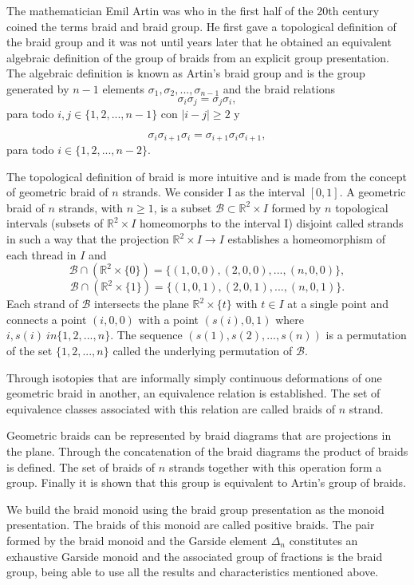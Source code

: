 \documentclass[12pt]{book}
\theoremstyle{definition}
\begin{document}
The mathematician Emil Artin was who in the first half of the 20th century coined the terms braid and braid group. He first gave a topological definition of the braid group and it was not until years later that he obtained an equivalent algebraic definition of the group of braids from an explicit group presentation. The algebraic definition is known as Artin's braid group and is the group generated by $n-1$ elements $\sigma_1, \sigma_2, ..., \sigma_{n-1}$ and the braid relations
$$\sigma_i\sigma_j = \sigma_j\sigma_i,$$
para todo $i,j\in\{1,2,...,n-1\}$ con $|i-j|\geq 2$ y

$$\sigma_i\sigma_{i+1}\sigma_i =\sigma_{i+1}\sigma_i\sigma_{i+1},$$
para todo $i\in\{1,2,...,n-2\}$.

The topological definition of braid is more intuitive and is made from the concept of geometric braid of $n$ strands. We consider I as the interval $[0,1]$. A geometric braid of $n$ strands, with $n\geq 1$, is a subset $\mathcal{B}\subset\mathbb{R}^2\times I$ formed by $n$ topological intervals (subsets of $\mathbb{R}^2\times I$ homeomorphs to the interval I) disjoint called strands in such a way that the projection $\mathbb{R}^2\times I\rightarrow I$ establishes a homeomorphism of each thread in $I$ and
$$\mathcal{B}\cap(\mathbb{R}^2\times \{0\})=\{(1,0,0),(2,0,0),...,(n,0,0)\},$$
$$\mathcal{B}\cap(\mathbb{R}^2\times \{1\})=\{(1,0,1),(2,0,1),...,(n,0,1)\}.$$
Each strand of $\mathcal {B}$ intersects the plane $\mathbb{R}^2 \times \{t \}$ with $t\in I$ at a single point and connects a point $(i, 0 , 0)$ with a point $(s(i), 0,1)$ where $i, s (i) \ in\{1,2, ..., n \} $. The sequence $(s(1), s(2), ..., s(n))$ is a permutation of the set $\{1,2, ..., n\}$ called the underlying permutation of $\mathcal{B}$.

Through isotopies that are informally simply continuous deformations of one geometric braid in another, an equivalence relation is established. The set of equivalence classes associated with this relation are called braids of $n$ strand.

Geometric braids can be represented by braid diagrams that are projections in the plane. Through the concatenation of the braid diagrams the product of braids is defined. The set of braids of $n$ strands together with this operation form a group. Finally it is shown that this group is equivalent to Artin's group of braids.

We build the braid monoid using the braid group presentation as the monoid presentation. The braids of this monoid are called positive braids. The pair formed by the braid monoid and the Garside element $\Delta_n$ constitutes an exhaustive Garside monoid and the associated group of fractions is the braid group, being able to use all the results and characteristics mentioned above.
\end{document}

